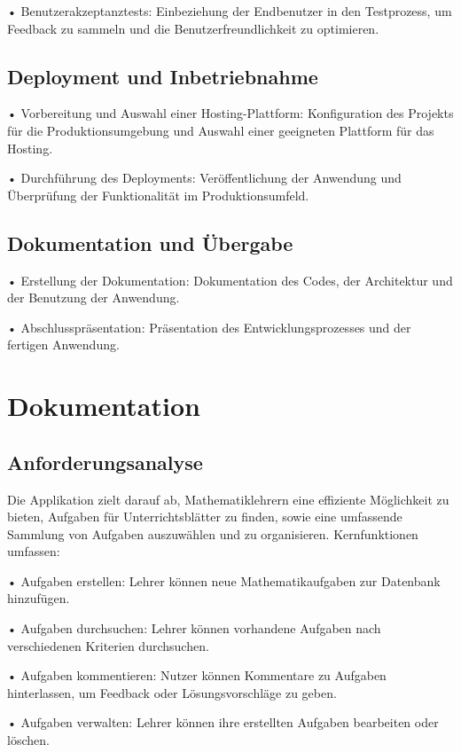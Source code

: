 \documentclass[12pt,a4paper]{article} %
\begin{document}
•	Benutzerakzeptanztests: Einbeziehung der Endbenutzer in den Testprozess, um Feedback zu sammeln und die Benutzerfreundlichkeit zu optimieren.


\subsection{Deployment und Inbetriebnahme}

•	Vorbereitung und Auswahl einer Hosting-Plattform: Konfiguration des Projekts für die Produktionsumgebung und Auswahl einer geeigneten Plattform für das Hosting.

•	Durchführung des Deployments: Veröffentlichung der Anwendung und Überprüfung der Funktionalität im Produktionsumfeld.

\subsection{Dokumentation und Übergabe}

•	Erstellung der Dokumentation: Dokumentation des Codes, der Architektur und der Benutzung der Anwendung.

•	Abschlusspräsentation: Präsentation des Entwicklungsprozesses und der fertigen Anwendung.

\newpage


\section{Dokumentation}

\subsection{Anforderungsanalyse}

Die Applikation zielt darauf ab, Mathematiklehrern eine effiziente Möglichkeit zu bieten, Aufgaben für Unterrichtsblätter zu finden, 
sowie eine umfassende Sammlung von Aufgaben auszuwählen und zu organisieren. Kernfunktionen umfassen:

•	   Aufgaben erstellen: Lehrer können neue Mathematikaufgaben zur Datenbank hinzufügen.

•	   Aufgaben durchsuchen: Lehrer können vorhandene Aufgaben nach verschiedenen Kriterien durchsuchen.

•	   Aufgaben kommentieren: Nutzer können Kommentare zu Aufgaben hinterlassen, um Feedback oder Lösungsvorschläge zu geben.

•	   Aufgaben verwalten: Lehrer können ihre erstellten Aufgaben bearbeiten oder löschen.
\end{document}
